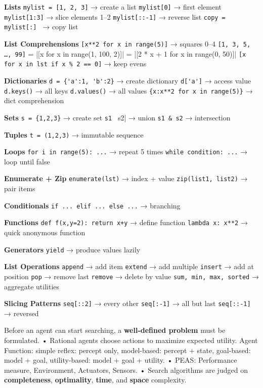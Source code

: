 ﻿\documentclass[10pt]{article}
\begin{document}
\begin{multicols*}{2}


\textbf{Lists}  
\verb|mylist = [1, 2, 3]| → create a list  
\verb|mylist[0]| → first element  
\verb|mylist[1:3]| → slice elements 1–2  
\verb|mylist[::-1]| → reverse list  
\verb|copy = mylist[:] | → copy list  

\textbf{List Comprehensions}  
\verb|[x**2 for x in range(5)]| → squares 0–4  
\verb|[1, 3, 5, …, 99]| = |[x for x in range(1, 100, 2)]| = |[2 * x + 1 for x in range(0, 50)]|
\verb|[x for x in lst if x % 2 == 0]| → keep evens  

\textbf{Dictionaries}  
\verb|d = {'a':1, 'b':2}| → create dictionary  
\verb|d['a']| → access value  
\verb|d.keys()| → all keys  
\verb|d.values()| → all values  
\verb|{x:x**2 for x in range(5)}| → dict comprehension  

\textbf{Sets}  
\verb|s = {1,2,3}| → create set  
\verb|s1 | s2| → union  
\verb|s1 & s2| → intersection  

\textbf{Tuples}  
\verb|t = (1,2,3)| → immutable sequence  

\textbf{Loops}  
\verb|for i in range(5): ...| → repeat 5 times  
\verb|while condition: ...| → loop until false  

\textbf{Enumerate + Zip}  
\verb|enumerate(lst)| → index + value  
\verb|zip(list1, list2)| → pair items  

\textbf{Conditionals}  
\verb|if ... elif ... else ...| → branching  

\textbf{Functions}  
\verb|def f(x,y=2): return x+y| → define function  
\verb|lambda x: x**2| → quick anonymous function  

\textbf{Generators}  
\verb|yield| → produce values lazily  

\textbf{List Operations}  
\verb|append| → add item  
\verb|extend| → add multiple  
\verb|insert| → add at position  
\verb|pop| → remove last  
\verb|remove| → delete by value  
\verb|sum, min, max, sorted| → aggregate utilities  

\textbf{Slicing Patterns}  
\verb|seq[::2]| → every other  
\verb|seq[:-1]| → all but last  
\verb|seq[::-1]| → reversed  


Before an agent can start searching, a \textbf{well-defined problem} must be formulated.  
• Rational agents choose actions to maximize expected utility. Agent Function: simple reflex: percept only, model-based: percept + state, goal-based: model + goal, utility-based: model + goal + utility.
• PEAS: Performance measure, Environment, Actuators, Sensors.
• Search algorithms are judged on \textbf{completeness}, \textbf{optimality}, \textbf{time}, and \textbf{space} complexity.  


\end{multicols*}
\end{document}
